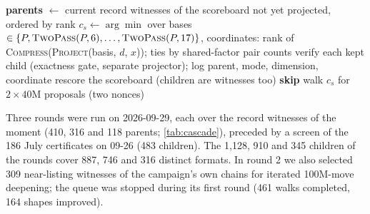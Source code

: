 \begin{algorithm}[t]
\caption{The projection cascade (one round).}\label{alg:cascade}
\begin{algorithmic}[1]
\State \textbf{parents} $\gets$ current record witnesses of the scoreboard not yet projected, ordered by rank
    \State $c_s\gets\arg\min$ over bases $\in\{P,\textsc{TwoPass}(P,6),\dots,\textsc{TwoPass}(P,17)\}$, coordinates:
    \Statex\hspace{2.6em}rank of \textsc{Compress}(\textsc{Project}(basis, $d$, $x$)); ties by shared-factor pair counts
  \EndFor
  \State verify each kept child (exactness gate, separate projector); log parent, mode, dimension, coordinate
\EndFor
\State rescore the scoreboard (children are witnesses too)
   \textbf{skip}
  \EndIf
  \State walk $c_s$ for $2\times40$M proposals (two nonces)
\EndFor
\end{algorithmic}
\end{algorithm}

Three rounds were run on 2026-09-29, each over the record witnesses of the moment (410, 316 and 118 parents; \cref{tab:cascade}), preceded by a screen of the 186 July certificates on 09-26 (483 children).
The 1{,}128, 910 and 345 children of the rounds cover 887, 746 and 316 distinct formats. In round 2 we also selected 309 near-listing witnesses of the campaign's own chains for iterated 100M-move deepening; the queue was stopped during its first round (461 walks completed, 164 shapes improved).

